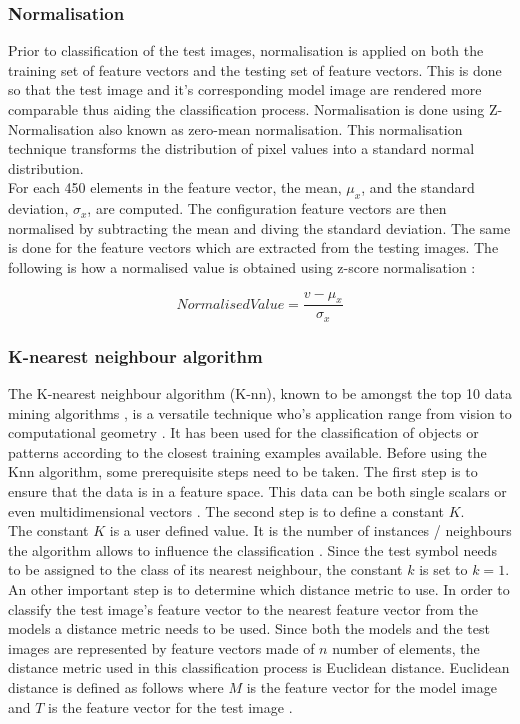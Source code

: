 \subsubsection{Normalisation}
Prior to classification of the test images, normalisation is applied on both the training set of feature vectors and the testing set of feature vectors. This is done so that the test image and it's corresponding model image are rendered more comparable thus aiding the classification process. Normalisation is done using Z-Normalisation also known as zero-mean normalisation. This normalisation technique transforms the distribution of pixel values into a standard normal distribution. \\

For each 450 elements in the feature vector, the mean, $\mu_{x}$, and the standard deviation, $\sigma_{x}$, are computed. The configuration feature vectors are then normalised by subtracting the mean and diving the standard deviation. The same is done for the feature vectors which are extracted from the testing images. The following is how a normalised value is obtained using z-score normalisation \cite{zscore}:

\begin{equation}
 NormalisedValue = \frac{v-\mu_{x}}{\sigma_{x}}
\end{equation}
\label{eq:gStandardDeviation}


\subsubsection{K-nearest neighbour algorithm}
The K-nearest neighbour algorithm (K-nn), known to be amongst the top 10 data mining algorithms \cite{Wu_2007}, is a versatile technique who's application range from vision to computational geometry \cite{knn_online}. It has been used for the classification of objects or patterns according to the closest training examples available. Before using the Knn algorithm, some prerequisite steps need to be taken. The first step is to ensure that the data is in a feature space. This data can be both single scalars or even multidimensional vectors \cite{knn_online}. The second step is to define a constant $K$. \\

The constant $K$ is a user defined value. It is the number of instances / neighbours the algorithm allows to influence the classification \cite{knn_online}. Since the test symbol needs to be assigned to the class of its nearest neighbour, the constant $k$ is set to $k=1$. An other important step is to determine which distance metric to use. In order to classify the test image's feature vector to the nearest feature vector from the models a distance metric needs to be used. Since both the models and the test images are represented by feature vectors made of $n$ number of elements, the distance metric used in this classification process is Euclidean distance. Euclidean distance is defined as follows where $M$ is the feature vector for the model image and $T$ is the feature vector for the test image \cite{euclidean_online}. 


